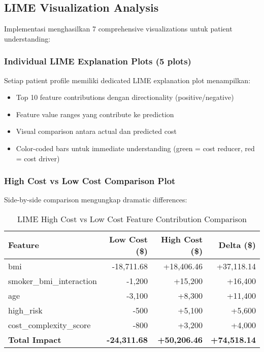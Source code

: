 \subsection{LIME Visualization Analysis}
\label{subsec:lime-visualizations}

Implementasi menghasilkan 7 comprehensive visualizations untuk patient understanding:

\subsubsection{Individual LIME Explanation Plots (5 plots)}

Setiap patient profile memiliki dedicated LIME explanation plot menampilkan:
\begin{itemize}
    \item Top 10 feature contributions dengan directionality (positive/negative)
    \item Feature value ranges yang contribute ke prediction
    \item Visual comparison antara actual dan predicted cost
    \item Color-coded bars untuk immediate understanding (green = cost reducer, red = cost driver)
\end{itemize}

\subsubsection{High Cost vs Low Cost Comparison Plot}

Side-by-side comparison mengungkap dramatic differences:

\begin{table}[H]
\centering
\caption{LIME High Cost vs Low Cost Feature Contribution Comparison}
\label{tab:lime-high-vs-low}
\begin{tabular}{|l|r|r|r|}
\hline
\textbf{Feature} & \textbf{Low Cost (\$)} & \textbf{High Cost (\$)} & \textbf{Delta (\$)} \\
\hline
bmi & -18,711.68 & +18,406.46 & +37,118.14 \\
smoker\_bmi\_interaction & -1,200 & +15,200 & +16,400 \\
age & -3,100 & +8,300 & +11,400 \\
high\_risk & -500 & +5,100 & +5,600 \\
cost\_complexity\_score & -800 & +3,200 & +4,000 \\
\hline
\textbf{Total Impact} & \textbf{-24,311.68} & \textbf{+50,206.46} & \textbf{+74,518.14} \\
\hline
\end{tabular}
\end{table}


